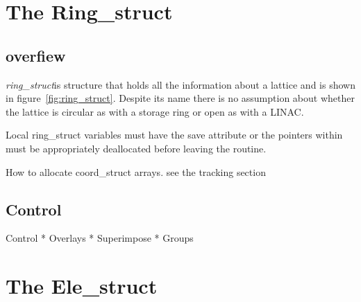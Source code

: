 \documentclass{book}
\newcommand{\rs}{{\it ring\_struct}}
\begin{document}
\chapter{The Ring\_struct}

\section{overfiew}

\rs is structure that holds all the information about a lattice
and is shown in figure~\ref{fig:ring_struct}. Despite its name there
is no assumption about whether the lattice is circular as with a
storage ring or open as with a LINAC.




Local ring_struct variables must have the save attribute or
the pointers within must be appropriately deallocated
before leaving the routine.

How to allocate coord_struct arrays. see the tracking section

\section{Control}
  Control
    * Overlays
    * Superimpose
    * Groups

\chapter{The Ele\_struct}
\end{document}

